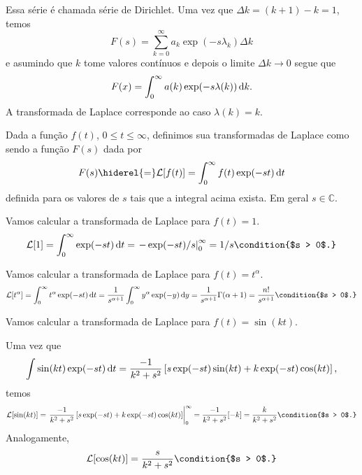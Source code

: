 Essa série é chamada série de Dirichlet. Uma vez que $\Delta k = (k + 1) - k =
1$, temos
\begin{dmath*}
  F(s) = \sum_{k = 0}^{\infty} a_k \exp(-s \lambda_k) \Delta k
\end{dmath*}
e asumindo que $k$ tome valores contínuos e depois o limite $\Delta k \to 0$
segue que
\begin{dmath*}
  F(x) = \int_0^{\infty} a(k) \exp(-s \lambda(k)) \vi{k}.
\end{dmath*}
A transformada de Laplace corresponde ao caso $\lambda(k) = k$.

\begin{defi}
  Dada a função $f(t)$, $0 \leq t \leq \infty$, definimos sua transformadas de
  Laplace como sendo a função $F(s)$ dada por
  \begin{dmath*}
    F(s) \hiderel{=} \mathcal{L}[f(t)] = \int_0^{\infty} f(t) \exp(-s t) \vi{t}
  \end{dmath*}
  definida para os valores de $s$ tais que a integral acima exista. Em geral $s
  \in \mathbb{C}$.
\end{defi}

\begin{exem}
  Vamos calcular a transformada de Laplace para $f(t) = 1$.
  \begin{dmath*}
    \mathcal{L}[1] = \int_0^{\infty} \exp(-s t) \vi{t}
    = \left. - \exp(-s t) / s \right|_0^{\infty}
    = 1 / s \condition{$s > 0$.}
  \end{dmath*}
\end{exem}

\begin{exem}
  Vamos calcular a transformada de Laplace para $f(t) = t^{\alpha}$.
  \begin{dmath*}
    \mathcal{L}[t^{\alpha}] = \int_0^{\infty} t^{\alpha} \exp(-s t) \vi{t}
    = \frac{1}{s^{\alpha + 1}} \int_0^{\infty} y^{\alpha} \exp(-y) \vi{y}
    = \frac{1}{s^{\alpha + 1}} \Gamma(\alpha + 1)
    = \frac{n!}{s^{\alpha + 1}} \condition{$s > 0$.}
  \end{dmath*}
\end{exem}

\begin{exem}
  Vamos calcular a transformada de Laplace para $f(t) = \sin(kt)$.

  Uma vez que
  \begin{dmath*}
    \int \sin(k t) \exp(-s t) \vi{t} = \frac{-1}{k^2 + s^2} \left[ s \exp(-s t)
    \sin(k t) + k \exp(-s t) \cos(k t) \right],
  \end{dmath*}
  temos
  \begin{dmath*}
    \mathcal{L}[\sin(k t)] = \left. \frac{-1}{k^2 + s^2} \left[ s \exp(-s t) + k
    \exp(-s t) \cos(k t) \right] \right|_0^{\infty}
    = \frac{-1}{k^2 + s^2} [-k]
    = \frac{k}{k^2 + s^2} \condition{$s > 0$.}
  \end{dmath*}
  Analogamente,
  \begin{dmath*}
    \mathcal{L}[\cos(k t)] = \frac{s}{k^2 + s^2} \condition{$s > 0$.}
  \end{dmath*}
\end{exem}


